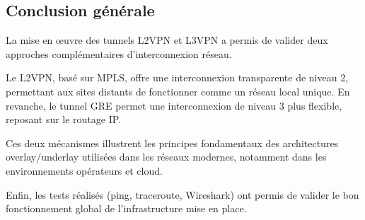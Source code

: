 \documentclass[12pt,a4paper, oneside]{memoir}
\begin{document}
\begin{enumerate}
\subsection{Conclusion générale}

La mise en œuvre des tunnels L2VPN et L3VPN a permis de valider deux approches complémentaires d’interconnexion réseau.

Le L2VPN, basé sur MPLS, offre une interconnexion transparente de niveau 2, permettant aux sites distants de fonctionner comme un réseau local unique. En revanche, le tunnel GRE permet une interconnexion de niveau 3 plus flexible, reposant sur le routage IP.

Ces deux mécanismes illustrent les principes fondamentaux des architectures overlay/underlay utilisées dans les réseaux modernes, notamment dans les environnements opérateurs et cloud.

Enfin, les tests réalisés (ping, traceroute, Wireshark) ont permis de valider le bon fonctionnement global de l’infrastructure mise en place.

\end{enumerate}
\end{document}
